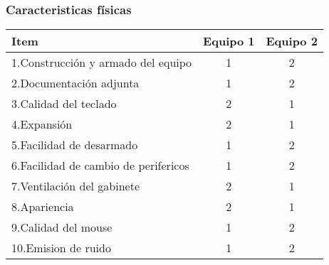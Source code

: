 \subsubsection{Caracteristicas físicas}
\begin{center}
\begin{tabular}{|lcc|} \hline
\footnotesize\textbf{Item} & \footnotesize\textbf{Equipo 1} & \footnotesize\textbf{Equipo 2} \\\hline
1.Construcción y armado del equipo & 1 & 2 \\\hline
2.Documentación adjunta & 1 & 2 \\\hline
3.Calidad del teclado & 2 & 1 \\\hline
4.Expansión & 2 & 1 \\\hline
5.Facilidad de desarmado & 1 & 2 \\\hline
6.Facilidad de cambio de perifericos & 1 & 2 \\\hline
7.Ventilación del gabinete & 2 & 1 \\\hline
8.Apariencia & 2 & 1 \\\hline
9.Calidad del mouse & 1 & 2 \\\hline
10.Emision de ruido & 1 & 2 \\\hline
\end{tabular}
\end{center}

